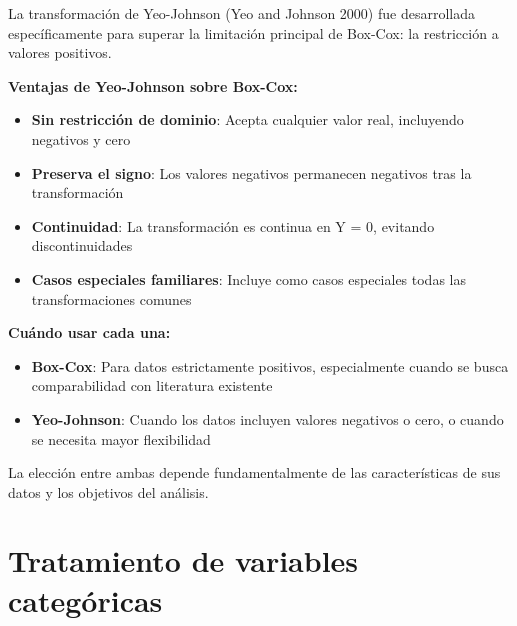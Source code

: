 \documentclass[
  letterpaper,
  DIV=11,
  numbers=noendperiod]{scrreprt}
\providecommand{\tightlist}{%
  \setlength{\itemsep}{0pt}\setlength{\parskip}{0pt}}
\begin{document}
\begin{tcolorbox}[enhanced jigsaw, breakable, toprule=.15mm, bottomtitle=1mm, coltitle=black, colbacktitle=quarto-callout-note-color!10!white, titlerule=0mm, opacitybacktitle=0.6, bottomrule=.15mm, toptitle=1mm, title=\textcolor{quarto-callout-note-color}{\faInfo}\hspace{0.5em}{Extensión: Transformación de Yeo-Johnson}, arc=.35mm, rightrule=.15mm, opacityback=0, colframe=quarto-callout-note-color-frame, leftrule=.75mm, left=2mm, colback=white]

La transformación de Yeo-Johnson (Yeo and Johnson 2000) fue desarrollada
específicamente para superar la limitación principal de Box-Cox: la
restricción a valores positivos.

\textbf{Ventajas de Yeo-Johnson sobre Box-Cox:}

\begin{itemize}
\tightlist
\item
  \textbf{Sin restricción de dominio}: Acepta cualquier valor real,
  incluyendo negativos y cero
\item
  \textbf{Preserva el signo}: Los valores negativos permanecen negativos
  tras la transformación
\item
  \textbf{Continuidad}: La transformación es continua en Y = 0, evitando
  discontinuidades
\item
  \textbf{Casos especiales familiares}: Incluye como casos especiales
  todas las transformaciones comunes
\end{itemize}

\textbf{Cuándo usar cada una:}

\begin{itemize}
\tightlist
\item
  \textbf{Box-Cox}: Para datos estrictamente positivos, especialmente
  cuando se busca comparabilidad con literatura existente
\item
  \textbf{Yeo-Johnson}: Cuando los datos incluyen valores negativos o
  cero, o cuando se necesita mayor flexibilidad
\end{itemize}

La elección entre ambas depende fundamentalmente de las características
de sus datos y los objetivos del análisis.

\end{tcolorbox}

\section{Tratamiento de variables
categóricas}\label{tratamiento-de-variables-categuxf3ricas}
\end{document}
